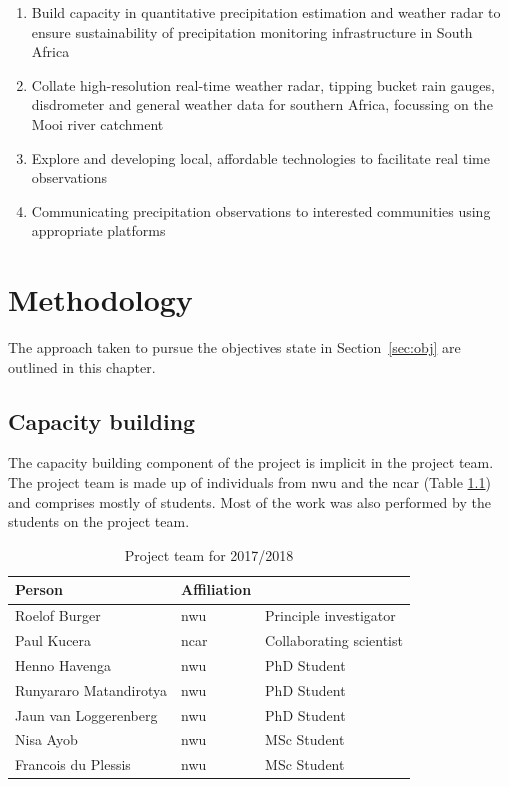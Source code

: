 \documentclass{wrcreport}
\begin{document}
\begin{enumerate}
\item Build capacity in quantitative precipitation estimation and weather radar to ensure sustainability of precipitation monitoring infrastructure in South Africa
\item Collate high-resolution real-time weather radar, tipping bucket rain gauges, disdrometer and general weather data for southern Africa, focussing on the Mooi river catchment 
\item Explore and developing local, affordable technologies to facilitate real time observations
\item Communicating precipitation observations to interested communities using appropriate platforms
\end{enumerate}


\chapter{Methodology}
\label{chap:meth}

The approach taken to pursue the objectives state in Section~\ref{sec:obj} are outlined in this chapter.

\section{Capacity building}

The capacity building component of the project is implicit in the
project team. The project team is made up of individuals from
\gls{nwu} and the \gls{ncar} (Table \ref{table:team}) and comprises mostly of
 students. Most of the work was also performed by the students on the project team.

\begin{table}[!htbp]
\caption{Project team for 2017/2018}
\label{table:team}
\begin{center}
\begin{tabular}{ l l l } 
\toprule
\bfseries Person & \bfseries Affiliation \\
\midrule
Roelof Burger & \gls{nwu}& Principle investigator \\
Paul Kucera  & \gls{ncar}& Collaborating scientist \\
Henno Havenga & \gls{nwu} & PhD Student \\
Runyararo Matandirotya & \gls{nwu} & PhD Student \\
Jaun van Loggerenberg & \gls{nwu} & PhD Student \\
Nisa Ayob & \gls{nwu} & MSc Student \\
Francois du Plessis & \gls{nwu} & MSc Student \\
\bottomrule 
\end{tabular}
\end{center}
\end{table}
\end{document}

